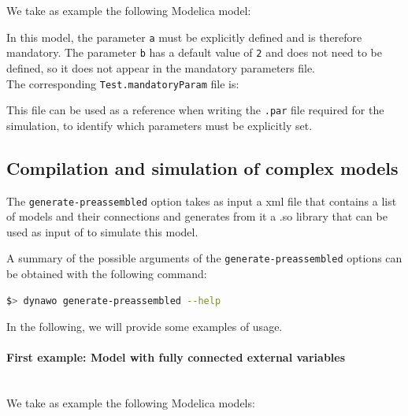 \documentclass[a4paper, 12pt]{report}
\begin{document}
We take as example the following Modelica model:

In this model, the parameter \lstinline[language=Modelica]{a} must be explicitly defined and is therefore mandatory. The parameter \lstinline[language=Modelica]{b} has a default value of \lstinline[language=Modelica]{2} and does not need to be defined, so it does not appear in the mandatory parameters file. \\

The corresponding \lstinline[language=bash]{Test.mandatoryParam} file is:


This file can be used as a reference when writing the \lstinline[language=bash]{.par} file required for the simulation, to identify which parameters must be explicitly set.

\subsection{Compilation and simulation of complex models}
\label{Dynawo_Advanced_Documentation_Dynawo_executables_Preassembled}

The \lstinline[language=bash]{generate-preassembled} option takes as input a xml file that contains a list of models and their connections and generates from it a .so library that can be used as input of \Dynawo to simulate this model.

A summary of the possible arguments of the \lstinline[language=bash]{generate-preassembled} options can be obtained with the following command:

\begin{lstlisting}[language=bash,deletekeywords={jobs,help}]
$> dynawo generate-preassembled --help
\end{lstlisting}

In the following, we will provide some examples of usage.

\paragraph{First example: Model with fully connected external variables}
~~\\
We take as example the following Modelica models:

\end{document}
